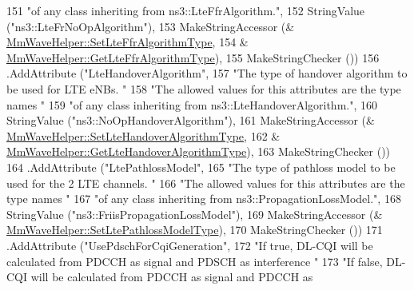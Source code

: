 \begin{DoxyCode}
151                            \textcolor{stringliteral}{"of any class inheriting from ns3::LteFfrAlgorithm."},
152                            StringValue (\textcolor{stringliteral}{"ns3::LteFrNoOpAlgorithm"}),
153                            MakeStringAccessor (&
      \hyperlink{classns3_1_1MmWaveHelper_a9c650eccf2725463af5bbf755a62bf8c}{MmWaveHelper::SetLteFfrAlgorithmType},
154                                                &
      \hyperlink{classns3_1_1MmWaveHelper_a9b6d9d9ea24485c6ad27a42bfc0ffa18}{MmWaveHelper::GetLteFfrAlgorithmType}),
155                            MakeStringChecker ())
156             .AddAttribute (\textcolor{stringliteral}{"LteHandoverAlgorithm"},
157                            \textcolor{stringliteral}{"The type of handover algorithm to be used for LTE eNBs. "}
158                            \textcolor{stringliteral}{"The allowed values for this attributes are the type names "}
159                            \textcolor{stringliteral}{"of any class inheriting from ns3::LteHandoverAlgorithm."},
160                            StringValue (\textcolor{stringliteral}{"ns3::NoOpHandoverAlgorithm"}),
161                            MakeStringAccessor (&
      \hyperlink{classns3_1_1MmWaveHelper_a4525907da523b03310aafe6c57d63d25}{MmWaveHelper::SetLteHandoverAlgorithmType},
162                                                &
      \hyperlink{classns3_1_1MmWaveHelper_a12eee130a565fd3a9b3752ea1772974d}{MmWaveHelper::GetLteHandoverAlgorithmType}),
163                            MakeStringChecker ())
164             .AddAttribute (\textcolor{stringliteral}{"LtePathlossModel"},
165                            \textcolor{stringliteral}{"The type of pathloss model to be used for the 2 LTE channels. "}
166                            \textcolor{stringliteral}{"The allowed values for this attributes are the type names "}
167                            \textcolor{stringliteral}{"of any class inheriting from ns3::PropagationLossModel."},
168                            StringValue (\textcolor{stringliteral}{"ns3::FriisPropagationLossModel"}),
169                            MakeStringAccessor (&
      \hyperlink{classns3_1_1MmWaveHelper_a0d7e7e72d52ada814b43c0378505993f}{MmWaveHelper::SetLtePathlossModelType}),
170                            MakeStringChecker ())
171             .AddAttribute (\textcolor{stringliteral}{"UsePdschForCqiGeneration"},
172                            \textcolor{stringliteral}{"If true, DL-CQI will be calculated from PDCCH as signal and PDSCH as
       interference "}
173                            \textcolor{stringliteral}{"If false, DL-CQI will be calculated from PDCCH as signal and PDCCH as
}
\end{DoxyCode}
